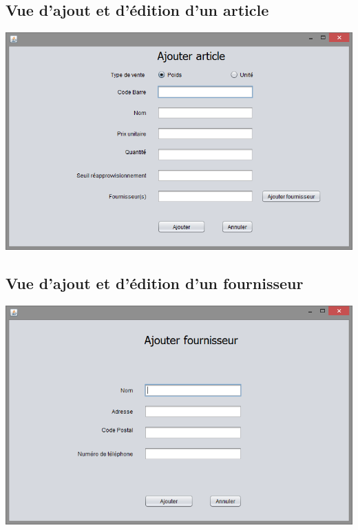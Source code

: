 \subsection{Vue d'ajout et d'édition d'un article}
\begin{center}
	\includegraphics[width=14cm]{FormArticle.png}
\end{center}

\subsection{Vue d'ajout et d'édition d'un fournisseur}
\begin{center}
	\includegraphics[width=14cm]{FormFournisseur.png}
\end{center}


